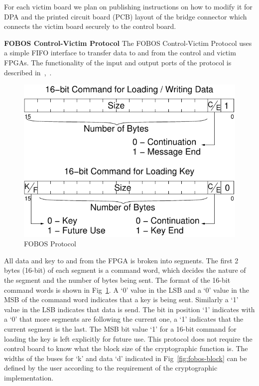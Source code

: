\documentclass{llncs}
\numberwithin{algorithm}{chapter}
\begin{document}
For each victim board we plan on publishing instructions on how to modify it for DPA
and the printed circuit board (PCB) layout of the bridge connector which connects
the victim board securely to the control board.


\textbf{FOBOS Control-Victim Protocol}
%
The FOBOS Control-Victim Protocol uses a simple FIFO interface to transfer data 
to and from the control and victim FPGAs.  The functionality of the input and output 
ports of the protocol is described in~\cite{1458},~\cite{GHR10}.
%
\begin{figure}[ht]
\begin{center}
\includegraphics[scale=0.7]{figures/protocol}
\caption{\label{fig:protocol}FOBOS Protocol}
\end{center} 
  \vspace{-3ex}%
\end{figure}
%
All data and key to and from the FPGA is broken into segments.
The first 2 bytes (16-bit) of each segment is a command word, which decides the nature 
of the segment and the number of bytes being sent. The format of the 16-bit command words 
is shown in Fig~\ref{fig:protocol}. A `0' value in the LSB and a `0' value in the MSB 
of the command word indicates that a key is being sent. 
Similarly a `1' value in the LSB indicates that data is send. The bit in position `1' 
indicates with a `0' that more segments are following the current one, a `1' indicates
that the current segment is the last.
The MSB bit value `1' for a 16-bit command for loading the key is left explicitly 
for future use.
This protocol does not require the control board to know what the block size of the
cryptographic function is.
The widths of the buses for `k' and data `d' indicated in Fig~\ref{fig:fobos-block} can be 
defined by the user according to the requirement of the cryptographic implementation. 
\end{document}
